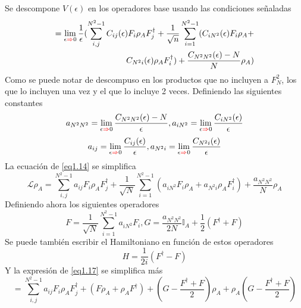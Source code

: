 \documentclass{book}
\begin{document}
Se descompone $V(\epsilon)$ en los operadores base usando las condiciones señaladas
\begin{equation}\label{eq1.14}\begin{aligned}=\lim\limits_{\epsilon\textcolor{red}{\Rightarrow} 0}\frac{1}{\epsilon}(\sum_{i,j}^{N^2-1} C_{ij}(\epsilon)F_i\rho_AF_j^\dag+\frac{1}{\sqrt{n}}\sum_{i=1}^{N^2-1}(C_{iN^2}(\epsilon)F_i\rho_A+\\ C_{N^2i}(\epsilon)\rho_AF_i^\dag)+\frac{C_{N^2N^2}(\epsilon)-N}{N}\rho_A)\end{aligned}\end{equation}
Como se puede notar de descompuso en los productos que no incluyen a $F_N^2$, los que lo incluyen una vez y el que lo incluye 2 veces. Definiendo las siguientes constantes
\begin{equation}\label{eq1.15} a_{N^2N^2}=\lim\limits_{\epsilon\textcolor{red}{\Rightarrow} 0}\frac{C_{N^2N^2}(\epsilon)-N}{\epsilon}, a_{iN^2}=\lim\limits_{\epsilon\textcolor{red}{\Rightarrow} 0}\frac{C_{iN^2}(\epsilon)}{\epsilon} \end{equation}
\begin{equation}\label{eq1.16} a_{ij}=\lim\limits_{\epsilon\textcolor{red}{\Rightarrow} 0}\frac{C_{ij}(\epsilon)}{\epsilon}, a_{ N^2 i}=\lim\limits_{\epsilon\textcolor{red}{\Rightarrow} 0}\frac{C_{N^2 i}(\epsilon)}{\epsilon} \end{equation}
La ecuación de \textcolor{blue}{\ref{eq1.14}} se simplifica
\begin{equation}\label{eq1.17}\mathcal{L}\rho_A=\sum_{i,j}^{N^2-1}a_{ij}F_i\rho_AF_j^\dag+\frac{1}{\sqrt{N}}\sum_{i=1}^{N^2-1}(a_{iN^2}F_i\rho_A+a_{N^2i}\rho_AF_i^\dag)+\frac{a_{N^2N^2}}{N}\rho_A\end{equation}
Definiendo ahora los siguientes operadores
\begin{equation}\label{eq1.18} F=\frac{1}{\sqrt{N}}\sum_{i=1}^{N^2-1}a_{iN^2}F_i, G=\frac{a_{N^2N^2}}{2N}\mathbb{I}_A+\frac{1}{2}(F^\dag+F)\end{equation}
Se puede también escribir el Hamiltoniano en función de estos operadores
\begin{equation}\label{eq1.19}  H=\frac{1}{2i}(F^\dag-F)\end{equation}
Y la expresión de \textcolor{blue}{\ref{eq1.17}} se simplifica más
\begin{equation}\label{eq1.20} =\sum_{i,j}^{N^2-1}a_{ij}F_i\rho_AF_j^\dag+(F\rho_A+\rho_AF^\dag)+(G-\frac{F^\dag+F}{2})\rho_A+\rho_A(G-\frac{F^\dag+F}{2})\end{equation}
\end{document}

